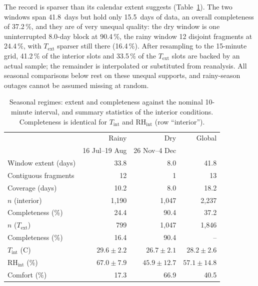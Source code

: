 \documentclass[conference]{IEEEtran}
\begin{document}
The record is sparser than its calendar extent suggests
(Table~\ref{tab:stats}). The two windows span 41.8~days but hold only
15.5~days of data, an overall completeness of 37.2\,\%, and they are of
very unequal quality: the dry window is one uninterrupted 8.0-day block
at 90.4\,\%, the rainy window 12 disjoint fragments at 24.4\,\%, with
$T_\text{ext}$ sparser still there (16.4\,\%). After resampling to the
15-minute grid, 41.2\,\% of the interior slots and 33.5\,\% of the
$T_\text{ext}$ slots are backed by an actual sample; the remainder is
interpolated or substituted from reanalysis. All seasonal comparisons
below rest on these unequal supports, and rainy-season outages cannot
be assumed missing at random.

\begin{table}[!t]
\centering
\caption{Seasonal regimes: extent and completeness against the nominal
  10-minute interval, and summary statistics of the interior
  conditions. Completeness is identical for $T_\text{int}$ and
  $\text{RH}_\text{int}$ (row ``interior'').}
\label{tab:stats}
\setlength{\tabcolsep}{4pt}
\begin{tabular}{@{}lrrr@{}}
\toprule
 & Rainy & Dry & Global \\
 & 16 Jul--19 Aug & 26 Nov--4 Dec & \\
\midrule
Window extent (days)             & 33.8 & 8.0 & 41.8 \\
Contiguous fragments             & 12   & 1   & 13 \\
Coverage (days)                  & 10.2 & 8.0 & 18.2 \\
\midrule
$n$ (interior)                   & 1{,}190 & 1{,}047 & 2{,}237 \\
Completeness (\%)                & 24.4 & 90.4 & 37.2 \\
$n$ ($T_\text{ext}$)             & 799  & 1{,}047 & 1{,}846 \\
Completeness (\%)                & 16.4 & 90.4 & -- \\
\midrule
$T_\text{int}$ (\textdegree{}C)  & $29.6\pm2.2$ & $26.7\pm2.1$ & $28.2\pm2.6$ \\
$\text{RH}_\text{int}$ (\%)      & $67.0\pm7.9$ & $45.9\pm12.7$ & $57.1\pm14.8$ \\
Comfort (\%)                     & 17.3 & 66.9 & 40.5 \\
\bottomrule
\end{tabular}
\end{table}
\end{document}

